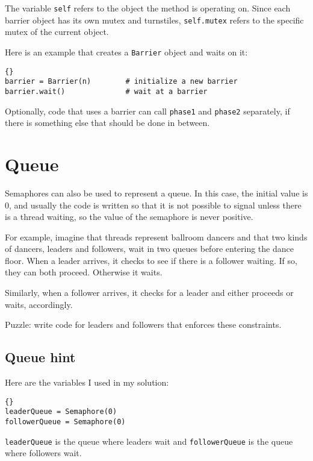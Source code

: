 \documentclass{book}
\newcommand{\clearemptydoublepage}{\newpage\cleardoublepage}
\begin{document}
The variable {\tt self} refers to the object the method
is operating on.  Since each barrier object has its own
mutex and turnstiles, {\tt self.mutex} refers to the specific
mutex of the current object.

Here is an example that creates a {\tt Barrier}
object and waits on it:

\begin{lstlisting}[title={Barrier interface}]{}
barrier = Barrier(n)        # initialize a new barrier
barrier.wait()              # wait at a barrier
\end{lstlisting}

Optionally, code that uses a barrier can call {\tt phase1} and
{\tt phase2} separately, if there is something else that
should be done in between.



\section{Queue}
\label{dancers}

Semaphores can also be used to represent a queue.  In this
case, the initial value is 0, and usually the code is written
so that it is not possible
to signal unless there is a thread waiting, so the value of the
semaphore is never positive.

For example, imagine that threads represent ballroom dancers
and that two kinds of dancers, leaders and followers, wait
in two queues before entering the dance floor.  When a leader
arrives, it checks to see if there is a follower waiting.
If so, they can both proceed.  Otherwise it waits.

Similarly, when a follower arrives, it checks for a leader and
either proceeds or waits, accordingly.

Puzzle: write code for leaders and followers that enforces these
constraints.



\clearemptydoublepage
\subsection {Queue hint}

Here are the variables I used in my solution:

\begin{lstlisting}[title={Queue hint}]{}
leaderQueue = Semaphore(0)
followerQueue = Semaphore(0)
\end{lstlisting}

{\tt leaderQueue} is the queue where leaders wait 
and {\tt followerQueue} is the queue where followers wait.
\end{document}

